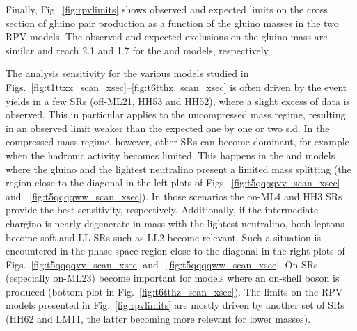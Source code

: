 Finally, Fig.~\ref{fig:rpvlimits} shows observed and expected limits on
the cross section of gluino pair production as a function of the gluino masses in
the two RPV models.
The observed and expected exclusions on the gluino mass are similar and reach 2.1 and 1.7 \TeV for the \ToqqqqL and \Totbs models, respectively.

The analysis sensitivity for the various models studied in Figs.~\ref{fig:t1ttxx_scan_xsec}--\ref{fig:t6tthz_scan_xsec} is often driven by the event yields in a few SRs (off-\PZ ML21, HH53 and HH52), where a slight excess of data is observed.
This in particular applies to the uncompressed mass regime, resulting in an observed limit weaker than the expected one by one or two s.d.
In the compressed mass regime, however, other SRs can become dominant, for example when the hadronic activity becomes limited. 
This happens in the \TfqqqqWZ and \TfqqqqWW models where the gluino and the lightest neutralino present a limited mass splitting (the region close to the diagonal in the left plots of Figs.~\ref{fig:t5qqqqvv_scan_xsec} and ~\ref{fig:t5qqqqww_scan_xsec}). In those scenarios the on-\PZ ML4 and HH3 SRs provide the best sensitivity, respectively. 
Additionally, if the intermediate chargino is nearly degenerate in mass with the lightest neutralino, both leptons become soft and LL SRs such as LL2 become relevant. Such a situation is encountered in the phase space region close to the diagonal in the right plots of Figs.~\ref{fig:t5qqqqvv_scan_xsec} and ~\ref{fig:t5qqqqww_scan_xsec}.
On-\PZ SRs (especially on-\PZ ML23) become important for models where an on-shell \PZ boson is produced (bottom plot in Fig.~\ref{fig:t6tthz_scan_xsec}).
The limits on the RPV models presented in Fig.~\ref{fig:rpvlimits} are mostly driven by another set of SRs (HH62 and LM11, the latter becoming more relevant for lower masses).


